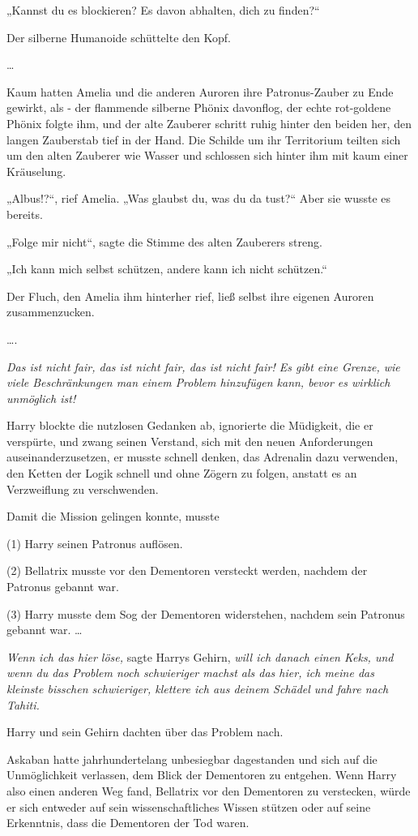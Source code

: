 {„Kannst du es blockieren? Es davon abhalten, dich zu finden?“

Der silberne Humanoide schüttelte den Kopf.

…

Kaum hatten Amelia und die anderen Auroren ihre Patronus-Zauber zu Ende gewirkt, als - der flammende silberne Phönix davonflog, der echte rot-goldene Phönix folgte ihm, und der alte Zauberer schritt ruhig hinter den beiden her, den langen Zauberstab tief in der Hand. Die Schilde um ihr Territorium teilten sich um den alten Zauberer wie Wasser und schlossen sich hinter ihm mit kaum einer Kräuselung.

„Albus!?“, rief Amelia. „Was glaubst du, was du da tust?“ Aber sie wusste es bereits.

„Folge mir nicht“, sagte die Stimme des alten Zauberers streng.

„Ich kann mich selbst schützen, andere kann ich nicht schützen.“

Der Fluch, den Amelia ihm hinterher rief, ließ selbst ihre eigenen Auroren zusammenzucken.

….

\emph{Das ist nicht fair, das ist nicht fair, das ist nicht fair! Es gibt eine Grenze, wie viele Beschränkungen man einem Problem hinzufügen kann, bevor es wirklich unmöglich ist!}

Harry blockte die nutzlosen Gedanken ab, ignorierte die Müdigkeit, die er verspürte, und zwang seinen Verstand, sich mit den neuen Anforderungen auseinanderzusetzen, er musste schnell denken, das Adrenalin dazu verwenden, den Ketten der Logik schnell und ohne Zögern zu folgen, anstatt es an Verzweiflung zu verschwenden.

Damit die Mission gelingen konnte, musste

(1) Harry seinen Patronus auflösen.

(2) Bellatrix musste vor den Dementoren versteckt werden, nachdem der Patronus gebannt war.

(3) Harry musste dem Sog der Dementoren widerstehen, nachdem sein Patronus gebannt war. …

\emph{Wenn ich das hier löse,} sagte Harrys Gehirn, \emph{will ich danach einen Keks, und wenn du das Problem noch schwieriger machst als das hier, ich meine das kleinste bisschen schwieriger, klettere ich aus deinem Schädel und fahre nach Tahiti.}

Harry und sein Gehirn dachten über das Problem nach.

Askaban hatte jahrhundertelang unbesiegbar dagestanden und sich auf die Unmöglichkeit verlassen, dem Blick der Dementoren zu entgehen. Wenn Harry also einen anderen Weg fand, Bellatrix vor den Dementoren zu verstecken, würde er sich entweder auf sein wissenschaftliches Wissen stützen oder auf seine Erkenntnis, dass die Dementoren der Tod waren.

}
